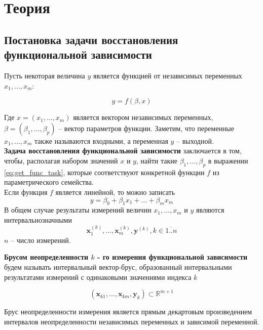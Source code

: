 \section{Теория}

\subsection{Постановка задачи восстановления функциональной зависимости}

Пусть некоторая величина $y$ является функцией от независимых переменных $x_1, \ldots, x_m$:

\begin{equation} \label{eq:get_func_task}
	y = f(\beta, x)
\end{equation}

Где $x = (x_1, \ldots, x_m)$ является вектором независимых переменных, $\beta = (\beta_1, \ldots, \beta_p)$ -- вектор параметров функции. Заметим, что переменные $x_1, \ldots, x_m$ также называются входными, а переменная $y$ -- выходной. \\
\textbf{Задача восстановления функциональной зависимости} заключается в том, чтобы, располагая набором значений $x$ и $y$, найти такие $\beta_1, \ldots, \beta_p$ в выражении \eqref{eq:get_func_task}, которые соответствуют конкретной функции $f$ из параметрического семейства. \\
Если функция $f$ является линейной, то можно записать 
\begin{equation}
	y = \beta_0 + \beta_1 x_1 + \ldots + \beta_m x_m
\end{equation}
В общем случае результаты измерений величин $x_1, \ldots, x_m$ и $y$ являются интервальнозначными 
\begin{equation*}
	\bm{x}_1^{(k)}, \ldots, \bm{x}_m^{(k)}, \bm{y}^{(k)}, k \in \overline{1..n}
\end{equation*} 
$n$ -- число измерений. 

\textbf{Брусом неопределенности $k$ - го измерения функциональной зависимости} будем называть интервальный вектор-брус, образованный интервальными результатами измерений с одинаковыми значениями индекса $k$

\begin{equation}
	(\bm{x}_{k1}, \ldots, \bm{x}_{km}, \bm{y}_k) \subset  \mathbb{R}^{m+1}
\end{equation}

Брус неопределенности измерения является прямым декартовым произведением интервалов неопределенности независимых переменных и зависимой переменной. 

